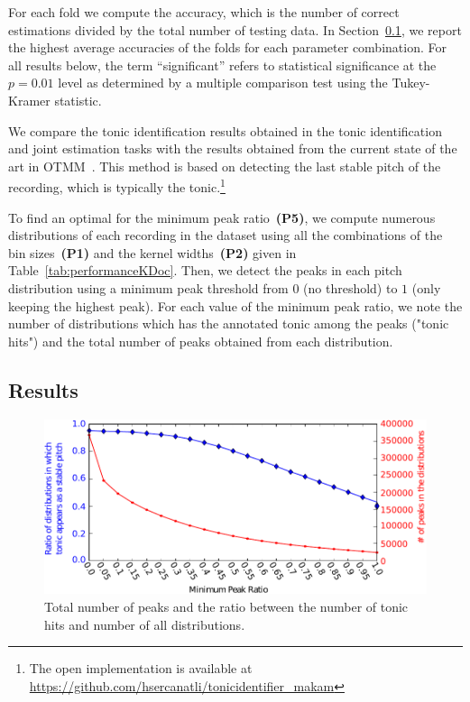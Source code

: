 \documentclass{sig-alternate}
\begin{document}
For each fold we compute the accuracy, which is the number of correct estimations divided by the total number of testing data. In Section~\ref{sec:results}, we
report the highest average accuracies of the folds for each parameter combination. For all results below, the term ``significant'' refers to statistical significance at the $p = 0.01$ level as determined by a multiple comparison test using the Tukey-Kramer statistic.

We compare the tonic identification results obtained in the tonic identification and joint estimation tasks with the results obtained from the current state of the art in OTMM~\cite{sercan_tonic}. This method is based on detecting the last stable pitch of the recording, which is typically the tonic.\footnote{The open implementation is available at \url{https://github.com/hsercanatli/tonicidentifier_makam}}

To find an optimal for the minimum peak ratio~\textbf{(P5)}, we compute numerous distributions of each recording in the dataset using all the combinations of the bin sizes~\textbf{(P1)} and the kernel widths~\textbf{(P2)} given in Table~\ref{tab:performanceKDoc}. Then, we detect the peaks in each pitch distribution using a minimum peak threshold from $0$ (no threshold) to $1$ (only keeping the highest peak). For each value of the minimum peak ratio, we note the number of distributions which has the annotated tonic among the peaks ("tonic hits") and the total number of peaks obtained from each distribution. 

\subsection{Results}\label{sec:results}

\begin{figure}
\centering
\includegraphics[width=\columnwidth]{figures/min_peak_ratio}
\caption{Total number of peaks and the ratio between the number of tonic hits and number of all distributions.}
\label{fig:min_peak_ratio}
\end{figure}
\end{document}

